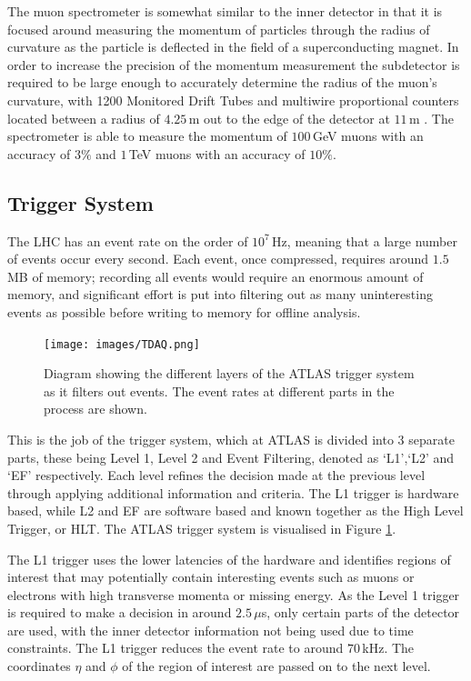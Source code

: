 \documentclass{article}
\begin{document}
The muon spectrometer is somewhat similar to the inner detector in that it is focused around measuring the momentum of particles through the radius of curvature as the particle is deflected in the field of a superconducting magnet. In order to increase the precision of the momentum measurement the subdetector is required to be large enough to accurately determine the radius of the muon's curvature, with 1200 Monitored Drift Tubes and multiwire proportional counters located between a radius of $4.25\,$m out to the edge of the detector at $11\,$m \cite{ATLASMuonSpectrometer}. The spectrometer is able to measure the momentum of $100\,$GeV muons with an accuracy of $3\%$ and $1\,$TeV muons with an accuracy of $10\%$.

\subsection{Trigger System}
\label{sec:ATLAS_Trigger}

The LHC has an event rate on the order of $10^7\,$Hz, meaning that a large number of events occur every second. Each event, once compressed, requires around $1.5\,$MB of memory; recording all events would require an enormous amount of memory, and significant effort is put into filtering out as many uninteresting events as possible before writing to memory for offline analysis.

\begin{figure}[h]
    \centering
    \texttt{[image: images/TDAQ.png]}
    \caption{ Diagram showing the different layers of the ATLAS trigger system as it filters out events. The event rates at different parts in the process are shown.\label{fig:TDAQ} }
\end{figure}

This is the job of the trigger system, which at ATLAS is divided into 3 separate parts, these being Level 1, Level 2 and Event Filtering, denoted as `L1',`L2' and `EF' respectively.  Each level refines the decision made at the previous level through applying additional information and criteria. The L1 trigger is hardware based, while L2 and EF are software based and known together as the High Level Trigger, or HLT. The ATLAS trigger system is visualised in Figure \ref{fig:TDAQ}.

The L1 trigger uses the lower latencies of the hardware and identifies regions of interest that may potentially contain interesting events such as muons or electrons with high transverse momenta or missing energy. As the Level 1 trigger is required to make a decision in around $2.5\,\mu$s, only certain parts of the detector are used, with the inner detector information not being used due to time constraints. The L1 trigger reduces the event rate to around $70\,$kHz. The coordinates $\eta$ and $\phi$ of the region of interest are passed on to the next level.
\end{document}
